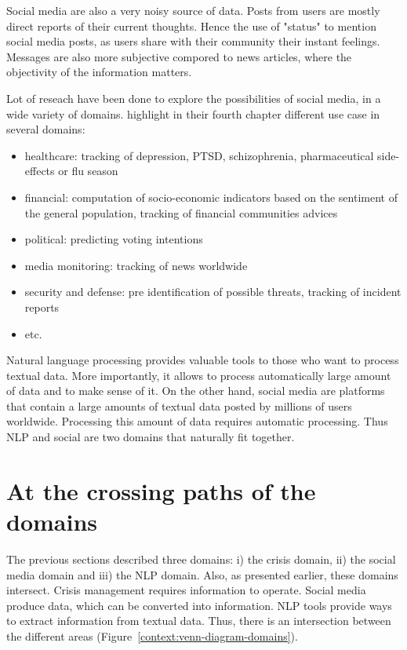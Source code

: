 Social media are also a very noisy source of data.
Posts from users are mostly direct reports of their current thoughts.
Hence the use of "status" to mention social media posts, as users share with their community their instant feelings.
Messages are also more subjective compored to news articles, where the objectivity of the information matters.

Lot of reseach have been done to explore the possibilities of social media, in a wide variety of domains.
highlight in their fourth chapter different use case in several domains:

\begin{itemize}
    \item healthcare: tracking of depression, PTSD, schizophrenia, pharmaceutical side-effects or flu season
    \item financial: computation of socio-economic indicators based on the sentiment of the general population, tracking of financial communities advices
    \item political: predicting voting intentions
    \item media monitoring: tracking of news worldwide
    \item security and defense: pre identification of possible threats, tracking of incident reports
    \item etc.
\end{itemize}

Natural language processing provides valuable tools to those who want to process textual data.
More importantly, it allows to process automatically large amount of data and to make sense of it.
On the other hand, social media are platforms that contain a large amounts of textual data posted by millions of users worldwide.
Processing this amount of data requires automatic processing.
Thus NLP and social are two domains that naturally fit together.

\section{At the crossing paths of the domains}
The previous sections described three domains: i) the crisis domain, ii) the social media domain and iii) the NLP domain.
Also, as presented earlier, these domains intersect.
Crisis management requires information to operate.
Social media produce data, which can be converted into information.
NLP tools provide ways to extract information from textual data.
Thus, there is an intersection between the different areas (Figure~\ref{context:venn-diagram-domains}).

